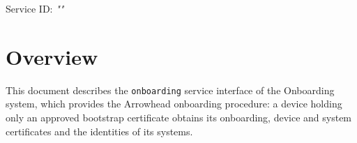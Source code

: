 \documentclass[a4paper]{arrowhead}
\begin{document}
\sloppy

\ArrowheadSetup

\begin{center}
  \vspace*{1cm}
  \huge{\arrowtitle}

  \vspace*{0.2cm}
  \LARGE{\arrowtype}
  \vspace*{1cm}

  \Large{Service ID: \textit{"\arrowid"}}

  \vspace*{\fill}


  \vspace*{1cm}
  \vspace*{\fill}

  \begin{abstract}
    This document describes the HTTP/1.1 protocol with TLS payload security and JSON payload encoding variant of the \texttt{onboarding} service of the Onboarding system.
  \end{abstract}

  \vspace*{1cm}
\end{center}

\newpage

\tableofcontents
\newpage

\section{Overview}
\label{sec:overview}

This document describes the \texttt{onboarding} service interface of the Onboarding system, which provides the Arrowhead onboarding procedure: a device holding only an approved bootstrap certificate obtains its onboarding, device and system certificates and the identities of its systems.
\end{document}
